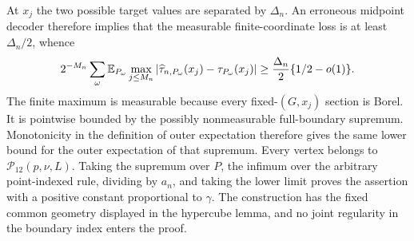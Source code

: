 At \(x_j\) the two possible target values are separated by \(\Delta_n\).  An erroneous midpoint decoder therefore implies that the measurable finite-coordinate loss is at least \(\Delta_n/2\), whence
\[
 2^{-M_n}\sum_\omega
 \mathbb E_{P_\omega}\max_{j\leq M_n}
 |\widehat\tau_{n,P_\omega}(x_j)-\tau_{P_\omega}(x_j)|
 \geq {\Delta_n\over2}\{1/2-o(1)\}.
\]
The finite maximum is measurable because every fixed-\((G,x_j)\) section is Borel.  It is pointwise bounded by the possibly nonmeasurable full-boundary supremum.  Monotonicity in the definition of outer expectation therefore gives the same lower bound for the outer expectation of that supremum.  Every vertex belongs to \(\mathcal P_{12}(p,\nu,L)\).  Taking the supremum over \(P\), the infimum over the arbitrary point-indexed rule, dividing by \(a_n\), and taking the lower limit proves the assertion with a positive constant proportional to \(\gamma\).  The construction has the fixed common geometry displayed in the hypercube lemma, and no joint regularity in the boundary index enters the proof.